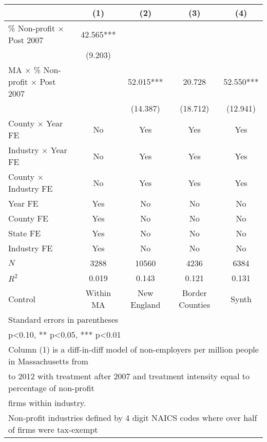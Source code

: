 {
\def\sym#1{\ifmmode^{#1}\else\(^{#1}\)\fi}
\begin{tabular}{l*{4}{c}}
\hline\hline
          &\multicolumn{1}{c}{(1)}&\multicolumn{1}{c}{(2)}&\multicolumn{1}{c}{(3)}&\multicolumn{1}{c}{(4)}\\
\hline
\% Non-profit $\times$ Post 2007&   42.565***&            &            &            \\
          &  (9.203)   &            &            &            \\
MA $\times$ \% Non-profit $\times$ Post 2007&            &   52.015***&   20.728   &   52.550***\\
          &            & (14.387)   & (18.712)   & (12.941)   \\
County $\times$ Year FE &       No   &      Yes   &      Yes   &      Yes   \\
Industry $\times$ Year FE &       No   &      Yes   &      Yes   &      Yes   \\
County $\times$ Industry FE &       No   &      Yes   &      Yes   &      Yes   \\
Year FE   &      Yes   &       No   &       No   &       No   \\
County FE &      Yes   &       No   &       No   &       No   \\
State FE  &      Yes   &       No   &       No   &       No   \\
Industry FE &      Yes   &       No   &       No   &       No   \\
\hline
\(N\)     &     3288   &    10560   &     4236   &     6384   \\
\(R^{2}\) &    0.019   &    0.143   &    0.121   &    0.131   \\
Control   &Within MA   &New England   &Border Counties   &    Synth   \\
\hline\hline
\multicolumn{5}{l}{\footnotesize Standard errors in parentheses}\\
\multicolumn{5}{l}{\footnotesize * p<0.10, ** p<0.05, *** p<0.01}\\
\multicolumn{5}{l}{\footnotesize Column (1) is a diff-in-diff model of non-employers per million people in Massachusetts from  }\\ 
\multicolumn{5}{l}{\footnotesize \space 2000 to 2012 with treatment after 2007 and treatment intensity equal to percentage of non-profit}\\ 
\multicolumn{5}{l}{\footnotesize \space firms within industry.}\\ 
\multicolumn{5}{l}{\footnotesize Non-profit industries defined by 4 digit NAICS codes where over half of firms were tax-exempt }\\

\end{tabular}}
